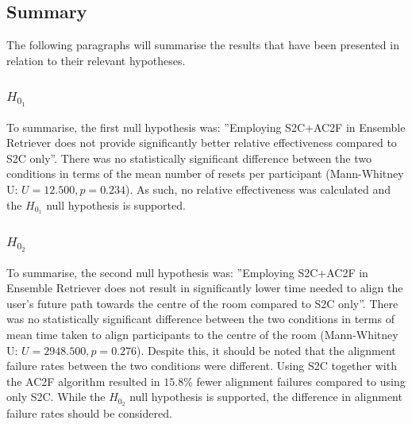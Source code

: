 \subsection{Summary}
The following paragraphs will summarise the results that have been presented in relation to their relevant hypotheses.  

\subsubsection{$H_{0_1}$}
To summarise, the first null hypothesis was: ''Employing S2C+AC2F in Ensemble Retriever does not provide significantly better relative effectiveness compared to S2C only''. There was no statistically significant difference between the two conditions in terms of the mean number of resets per participant (Mann-Whitney U: $U = 12.500, p = 0.234$). As such, no relative effectiveness was calculated and the $H_{0_1}$ null hypothesis is supported.

\subsubsection{$H_{0_2}$}
To summarise, the second null hypothesis was: ''Employing S2C+AC2F in Ensemble Retriever does not result in significantly lower time needed to align the user's future path towards the centre of the room compared to S2C only''. There was no statistically significant difference between the two conditions in terms of mean time taken to align participants to the centre of the room (Mann-Whitney U: $U = 2948.500, p = 0.276$). Despite this, it should be noted that the alignment failure rates between the two conditions were different. Using S2C together with the AC2F algorithm resulted in $15.8\%$ fewer alignment failures compared to using only S2C. While the $H_{0_2}$ null hypothesis is supported, the difference in alignment failure rates should be considered.